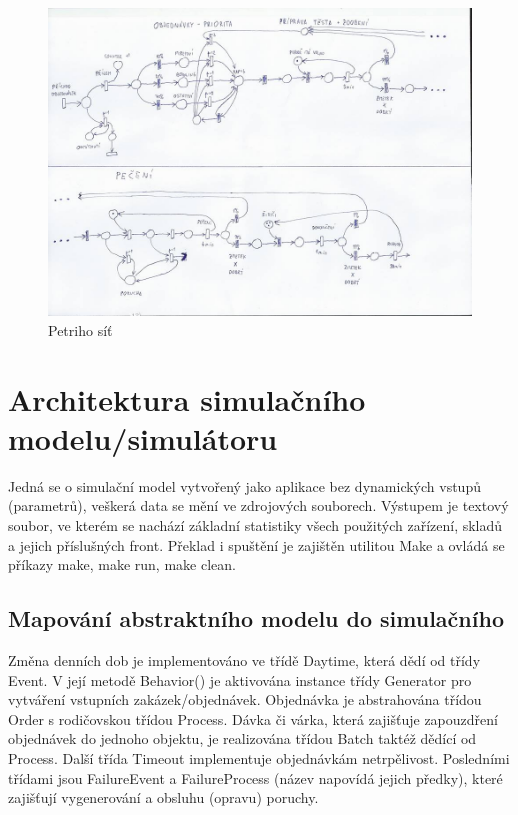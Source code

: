 \documentclass[a4paper, 12pt]{article}[9.12.2013]
\begin{document}
\begin{figure}[h]
    \centering
    \includegraphics[width=\textwidth,height=\textheight,keepaspectratio]{ps.jpg}
    \caption{Petriho síť}
    \label{fig:petriho_sit}
\end{figure}

\section{Architektura simulačního modelu/simulátoru} \label{architektura}
Jedná se o simulační model vytvořený jako aplikace bez dynamických vstupů
(parametrů), veškerá data se mění ve zdrojových souborech. Výstupem je textový soubor,
ve kterém se nachází základní statistiky všech použitých zařízení, skladů a
jejich příslušných front. Překlad i spuštění je zajištěn utilitou Make a
ovládá se příkazy make, make run, make clean.

\subsection{Mapování abstraktního modelu do simulačního} \label{architektura:mapovani}
Změna denních dob je implementováno ve třídě Daytime, která dědí od třídy
Event. V její metodě Behavior() je aktivována instance třídy Generator pro
vytváření vstupních zakázek/objednávek. Objednávka je abstrahována třídou Order s rodičovskou třídou Process.
Dávka či várka, která zajišťuje zapouzdření objednávek do jednoho objektu, je
realizována třídou Batch taktéž dědící od Process. Další třída Timeout
implementuje objednávkám netrpělivost. Posledními třídami jsou FailureEvent a
FailureProcess (název napovídá jejich předky), které zajišťují vygenerování a
obsluhu (opravu) poruchy.
\end{document}
